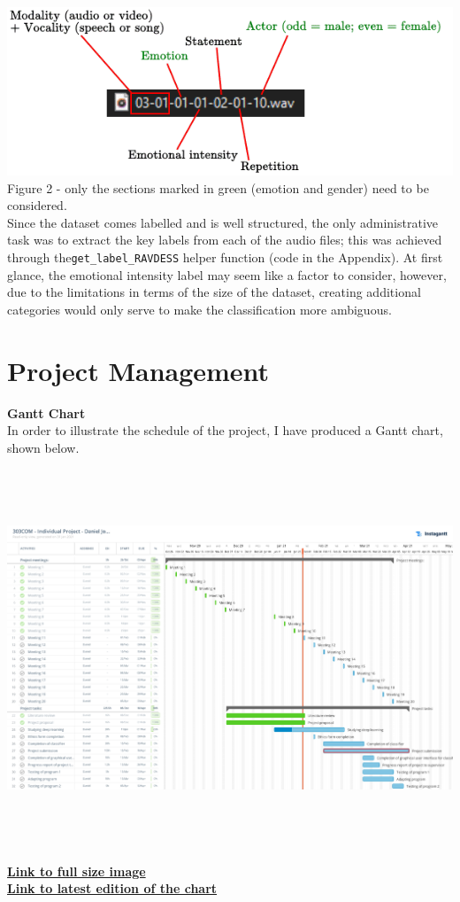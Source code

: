 \documentclass[12pt]{article}
\newcommand{\code}[1]{\colorbox{light-gray}{\texttt{#1}}}
\begin{document}
\includegraphics{figure_2_dataset_audio_example}
Figure 2 - only the sections marked in green (emotion and gender) need to be considered.
\\


\noindent Since the dataset comes labelled and is well structured, the only administrative task was to extract the key labels from each of the audio files; this was achieved through the\code{get\_label\_RAVDESS} helper function (code in the Appendix). At first glance, the emotional intensity label may seem like a factor to consider, however, due to the limitations in terms of the size of the dataset, creating additional categories would only serve to make the classification more ambiguous.
\\
\newpage

\section{Project Management}
\noindent \textbf{Gantt Chart}
\\
\noindent In order to illustrate the schedule of the project, I have produced a Gantt chart, shown below.
\\
\includegraphics[width=18cm, height=12cm]{Daniel_Jones_Gantt_Chart}
\\
\noindent \href{https://i.imgur.com/9tchO4N.jpg}{\color{blue}\textbf{Link to full size image}}
\\
\noindent \href{https://app.instagantt.com/shared/s/PdaKZZeApqszVu1eftjC/latest}{\color{blue}\textbf{Link to latest edition of the chart}}
\\
\newpage
\end{document}
